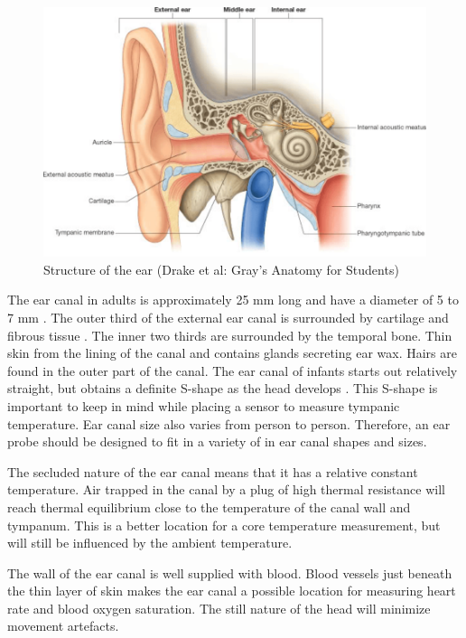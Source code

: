 \begin{figure}
   \centering
   \includegraphics[scale=0.7]{figs/EarSection}
   \caption{Structure of the ear (Drake et al: Gray's Anatomy for Students)}
   \label{fig:EarSection}
\end{figure}
 
The ear canal in adults is approximately 25 mm long and have a diameter of 5 to 7 mm \citep{alvord1997anatomy}. The outer third of the external ear canal is surrounded by cartilage and fibrous tissue \citep{ExternalAuditoryCanal}. The inner two thirds are surrounded by the temporal bone. Thin skin from the lining of the canal and contains glands secreting ear wax. Hairs are found in the outer part of the canal. The ear canal of infants starts out relatively straight, but obtains a definite S-shape as the head develops \citep{alvord1997anatomy}. This S-shape is important to keep in mind while placing a sensor to measure tympanic temperature. Ear canal size also varies from person to person. Therefore, an ear probe should be designed to fit in a variety of in ear canal shapes and sizes.

\medskip

The secluded nature of the ear canal means that it has a relative constant temperature. Air trapped in the canal by a plug of high thermal resistance will reach thermal equilibrium close to the temperature of the canal wall and tympanum. This is a better location for a core temperature measurement, but will still be influenced by the ambient temperature.

\medskip

The wall of the ear canal is well supplied with blood. Blood vessels just beneath the thin layer of skin makes the ear canal a possible location for measuring heart rate and blood oxygen saturation. The still nature of the head will minimize movement artefacts.

